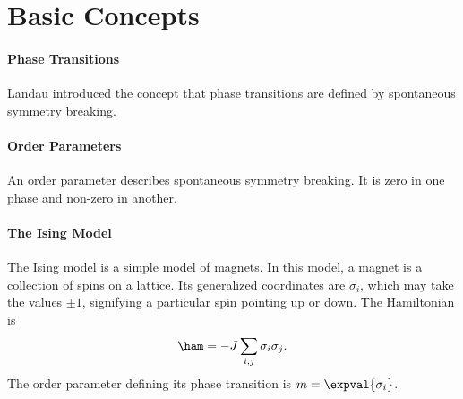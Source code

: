 \section{Basic Concepts}

\paragraph{Phase Transitions}
Landau introduced the concept that phase transitions are defined by spontaneous symmetry breaking.

\paragraph{Order Parameters}
An order parameter describes spontaneous symmetry breaking. It is zero in one phase and non-zero in another.

\paragraph{The Ising Model}
The Ising model is a simple model of magnets. In this model, a magnet is a collection of spins on a lattice. Its generalized coordinates are $\sigma_{i}$, which may take the values $\pm 1$, signifying a particular spin pointing up or down. The Hamiltonian is
\begin{align*}
	\ham = -J\sum\limits_{i, j}\sigma_{i}\sigma_{j}.
\end{align*}
The order parameter defining its phase transition is $m = \expval{\sigma_{i}}$.